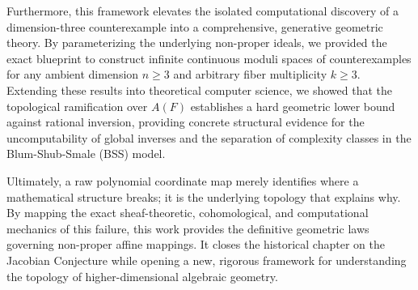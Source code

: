 \documentclass[11pt,reqno]{amsart}
\theoremstyle{definition}
\begin{document}
Furthermore, this framework elevates the isolated computational discovery of a dimension-three counterexample into a comprehensive, generative geometric theory. By parameterizing the underlying non-proper ideals, we provided the exact blueprint to construct infinite continuous moduli spaces of counterexamples for any ambient dimension $n \ge 3$ and arbitrary fiber multiplicity $k \ge 3$. Extending these results into theoretical computer science, we showed that the topological ramification over $A(F)$ establishes a hard geometric lower bound against rational inversion, providing concrete structural evidence for the uncomputability of global inverses and the separation of complexity classes in the Blum-Shub-Smale (BSS) model.

Ultimately, a raw polynomial coordinate map merely identifies where a mathematical structure breaks; it is the underlying topology that explains why. By mapping the exact sheaf-theoretic, cohomological, and computational mechanics of this failure, this work provides the definitive geometric laws governing non-proper affine mappings. It closes the historical chapter on the Jacobian Conjecture while opening a new, rigorous framework for understanding the topology of higher-dimensional algebraic geometry.



\end{document}

